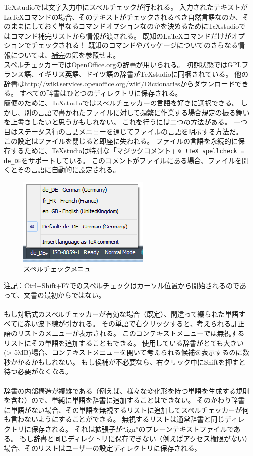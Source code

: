 \documentclass[]{book}
\makeatletter
\def\maxwidth{\ifdim\Gin@nat@width>\linewidth\linewidth
\else\Gin@nat@width\fi}
\let\Oldincludegraphics\includegraphics
\renewcommand{\includegraphics}[1]{\Oldincludegraphics[width=\maxwidth]{#1}}
\makeatother
\begin{document}
TeXstudioでは文字入力中にスペルチェックが行われる。
入力されたテキストがLaTeXコマンドの場合、そのテキストがチェックされるべき自然言語なのか、そのままにしておく単なるコマンドオプションなのかを決めるためにTeXstudioではコマンド補完リストから情報が渡される。
既知のLaTeXコマンドだけがオプションでチェックされる！
既知のコマンドやパッケージについてのさらなる情報については、\hyperref[SECTION040]{補完}の節を参照せよ。\\
スペルチェッカーではOpenOffice.orgの辞書が用いられる。
初期状態ではGPLフランス語、イギリス英語、ドイツ語の辞書がTeXstudioに同梱されている。
他の辞書は\href{http://wiki.services.openoffice.org/wiki/Dictionaries}{http://wiki.services.openoffice.org/wiki/Dictionaries}からダウンロードできる。
すべての辞書はひとつのディレクトリに保存される。\\
簡便のために、TeXstudioではスペルチェッカーの言語を好きに選択できる。
しかし、別の言語で書かれたファイルに対して頻繁に作業する場合規定の振る舞いを上書きしたいと思うかもしれない。
これを行うには二つの方法がある。
一つ目はステータス行の言語メニューを通じてファイルの言語を明示する方法だ。
この設定はファイルを閉じると即座に失われる。
ファイルの言語を永続的に保存するために、TeXstudioは特別な「マジックコメント」\lstinline"% !TeX spellcheck = de_DE"をサポートしている。
このコメントがファイルにある場合、ファイルを開くとその言語に自動的に設定される。

\begin{figure}[htbp]
\centering
\includegraphics{spellcheck_menu.png}
\caption{スペルチェックメニュー}
\end{figure}

注記：Ctrl+Shift+F7でのスペルチェックはカーソル位置から開始されるのであって、文書の最初からではない。\\\\
もし対話式のスペルチェッカーが有効な場合（既定）、間違って綴られた単語すべてに赤い波下線が引かれる。
その単語で右クリックすると、考えられる訂正語のリストのメニューが表示される。
このコンテキストメニューでは無視するリストにその単語を追加することもできる。
使用している辞書がとても大きい(\textgreater{}
5MB)場合、コンテキストメニューを開いて考えられる候補を表示するのに数秒かかるかもしれない。
もし候補が不必要なら、右クリック中にShiftを押すと待つ必要がなくなる。\\\\
辞書の内部構造が複雑である（例えば、様々な変化形を持つ単語を生成する規則を含む）ので、単純に単語を辞書に追加することはできない。
そのかわり辞書に単語がない場合、その単語を無視するリストに追加してスペルチェッカーが何も言わないようにすることができる。
無視するリストは通常辞書と同じディレクトリに保存される。
それは拡張子が``.ign''のプレーンテキストファイルである。
もし辞書と同じディレクトリに保存できない（例えばアクセス権限がない）場合、そのリストはユーザーの設定ディレクトリに保存される。
\end{document}

